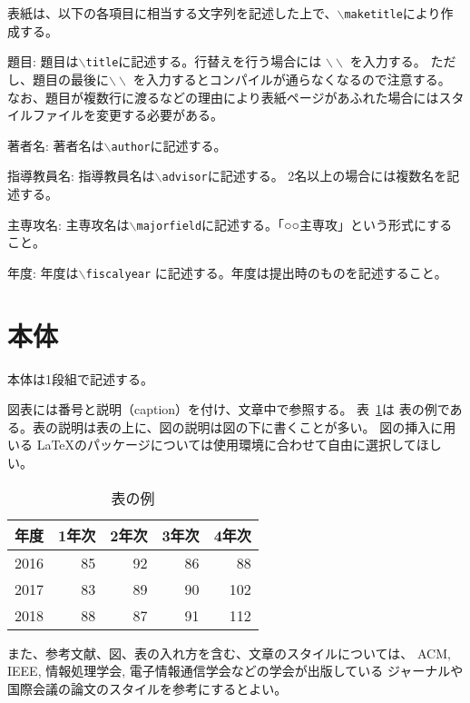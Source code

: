 \documentclass[a4paper,11pt]{jreport}
\begin{document}
表紙は、以下の各項目に相当する文字列を記述した上で、\texttt{$\backslash$maketitle}により作成する。

\begin{description} \parskip=1pt
\item{題目: }
題目は\texttt{$\backslash$title}に記述する。行替えを行う場合には $\backslash \backslash$ を入力する。
ただし、題目の最後に$\backslash \backslash$ を入力するとコンパイルが通らなくなるので注意する。
なお、題目が複数行に渡るなどの理由により表紙ページがあふれた場合にはスタイルファイルを変更する必要がある。
\item{著者名: }
著者名は\texttt{$\backslash$author}に記述する。
\item{指導教員名: }
指導教員名は\texttt{$\backslash$advisor}に記述する。
2名以上の場合には複数名を記述する。
\item{主専攻名: }
主専攻名は\texttt{$\backslash$majorfield}に記述する。「○○主専攻」という形式にすること。
\item{年度: }
年度は\texttt{$\backslash$fiscalyear} に記述する。年度は提出時のものを記述すること。
\end{description}

\section{本体}

本体は1段組で記述する。

図表には番号と説明（caption）を付け、文章中で参照する。
表~\ref{table:scores}は
表の例である。表の説明は表の上に、図の説明は図の下に書くことが多い。
図の挿入に用いる \LaTeX のパッケージについては使用環境に合わせて自由に選択してほしい。

\begin{table}[hbt]
\caption{表の例}
\label{table:scores}
\begin{center}
\begin{tabular}{|c|r|r|r|r|}
\hline
年度 & 1年次 & 2年次 & 3年次 & 4年次 \\
\hline
2016 & 85 & 92 & 86 &  88 \\
2017 & 83 & 89 & 90 & 102 \\
2018 & 88 & 87 & 91 & 112 \\
\hline 
\end{tabular}
\end{center}
\end{table}
\medskip

また、参考文献、図、表の入れ方を含む、文章のスタイルについては、
ACM, IEEE, 情報処理学会, 電子情報通信学会などの学会が出版している
ジャーナルや国際会議の論文のスタイルを参考にするとよい。
\end{document}

